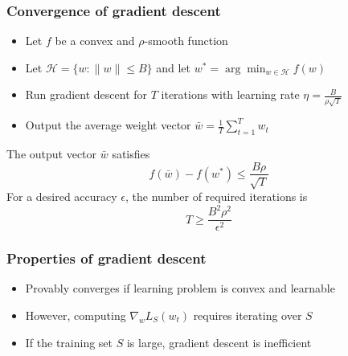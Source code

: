 \documentclass[10pt]{beamer}
\begin{document}

\begin{frame}
  \frametitle{Convergence of gradient descent}
  \begin{itemize}
	\item Let $f$ be a convex and $\rho$-smooth function
	\item Let $\mathcal{H}=\{w:\lVert w\rVert \leq B\}$ and let $w^* = \arg\min_{w\in\mathcal{H}} f(w)$
	\item Run gradient descent for $T$ iterations with learning rate $\eta = \frac B {\rho\sqrt{T}}$
	\item Output the {\color{red} average} weight vector $\bar{w}=\frac 1 T \sum_{t=1}^T w_t$
  \end{itemize}
  \pause
  \begin{theorem}
	The output vector $\bar{w}$ satisfies
	\[f(\bar{w}) - f(w^*) \leq \frac {B\rho} {\sqrt{T}}\]
	For a desired accuracy $\epsilon$, the number of required iterations is
	\[T \geq \frac {B^2\rho^2} {\epsilon^2}\]
  \end{theorem}
\end{frame}

\begin{frame}
  \frametitle{Properties of gradient descent}
  \begin{itemize}
	\item Provably converges if learning problem is convex and learnable
	\item However, computing $\nabla_w L_S(w_t)$ requires iterating over $S$
	\item If the training set $S$ is large, gradient descent is {\color{red} inefficient}
  \end{itemize}
\end{frame}
\end{document}
